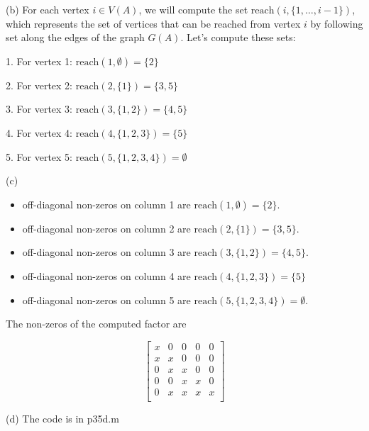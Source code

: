 \documentclass[12pt]{article}
\begin{document}
\begin{enumerate}[leftmargin=\labelsep]
(b) For each vertex $i \in V(A)$, we will compute the set $\text{reach}(i, \{1, \ldots, i - 1\})$, which represents the set of vertices that can be reached from vertex $i$ by following set along the edges of the graph $G(A)$. Let's compute these sets:

1. For vertex 1:
   $\text{reach}(1, \emptyset) = \{2\}$ 

2. For vertex 2:
   $\text{reach}(2, \{1\}) = \{3, 5\}$ 

3. For vertex 3:
   $\text{reach}(3, \{1, 2\}) = \{4, 5\}$ 

4. For vertex 4:
   $\text{reach}(4, \{1, 2, 3\}) = \{5\}$ 

5. For vertex 5:
   $\text{reach}(5, \{1, 2, 3, 4\}) = \emptyset$ 

(c) 

\begin{itemize}
\item off-diagonal non-zeros on column 1 are $\text{reach}(1, \emptyset) = \{2\}$.
\item off-diagonal non-zeros on column 2 are $\text{reach}(2, \{1\}) = \{3, 5\}$.
\item off-diagonal non-zeros on column 3 are $\text{reach}(3, \{1, 2\}) = \{4, 5\}$.
\item off-diagonal non-zeros on column 4 are $\text{reach}(4, \{1, 2, 3\}) = \{5\}$
\item off-diagonal non-zeros on column 5 are $\text{reach}(5, \{1, 2, 3, 4\}) = \emptyset$.

\end{itemize}

The non-zeros of the computed factor are

\[
\begin{bmatrix}
x & 0 & 0 & 0 & 0 \\
x & x & 0 & 0 & 0 \\
0 & x & x & 0 & 0 \\
0 & 0 & x & x & 0 \\
0 & x & x & x & x \\
\end{bmatrix}
\]

(d) The code is in p35d.m
\end{enumerate}
\end{document}
